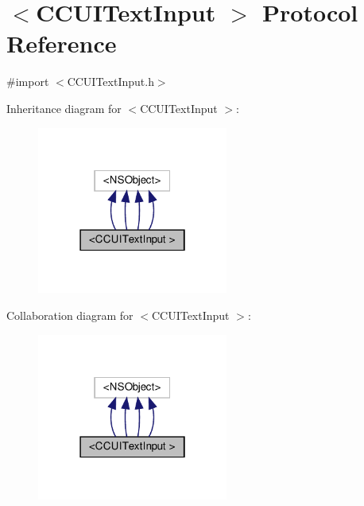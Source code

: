 \hypertarget{protocolCCUITextInput_01-p}{}\section{$<$C\+C\+U\+I\+Text\+Input $>$ Protocol Reference}
\label{protocolCCUITextInput_01-p}


{\ttfamily \#import $<$C\+C\+U\+I\+Text\+Input.\+h$>$}



Inheritance diagram for $<$C\+C\+U\+I\+Text\+Input $>$\+:
\nopagebreak
\begin{figure}[H]
\begin{center}
\leavevmode
\includegraphics[width=178pt]{protocolCCUITextInput_01-p__inherit__graph}
\end{center}
\end{figure}


Collaboration diagram for $<$C\+C\+U\+I\+Text\+Input $>$\+:
\nopagebreak
\begin{figure}[H]
\begin{center}
\leavevmode
\includegraphics[width=178pt]{protocolCCUITextInput_01-p__coll__graph}
\end{center}
\end{figure}
